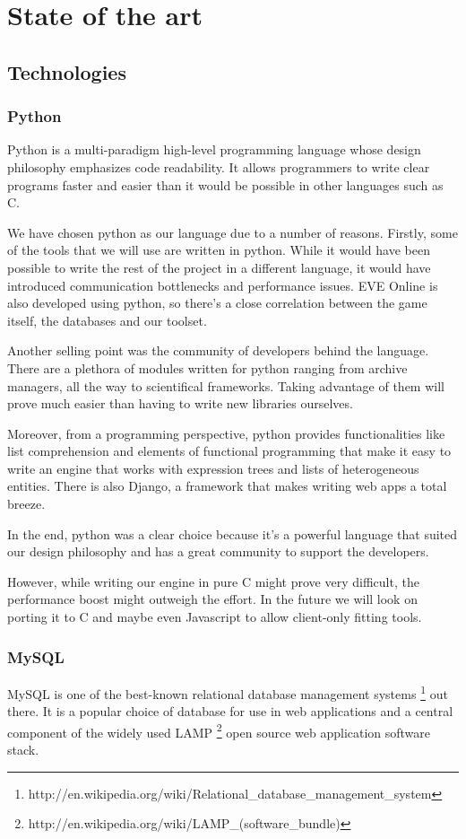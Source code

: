 \chapter{State of the art}
\label{chapter:research}

\section{Technologies}
\subsection{Python}

Python \cite{python} is a multi-paradigm high-level programming language whose design philosophy emphasizes code readability. It allows programmers to write clear programs faster and easier than it would be possible in other languages such as C.

We have chosen python as our language due to a number of reasons. Firstly, some of the tools that we will use are written in python. While it would have been possible to write the rest of the project in a different language, it would have introduced communication bottlenecks and performance issues. EVE Online is also developed using python, so there’s a close correlation between the game itself, the databases and our toolset. 

Another selling point was the community of developers behind the language. There are a plethora of modules written for python ranging from archive managers, all the way to scientifical frameworks. Taking advantage of them will prove much easier than having to write new libraries ourselves.

Moreover, from a programming perspective, python provides functionalities like list comprehension and elements of functional programming that make it easy to write an engine that works with expression trees and lists of heterogeneous entities. There is also Django, a framework that makes writing web apps a total breeze.

In the end, python was a clear choice because it’s a powerful language that suited our design philosophy and has a great community to support the developers.

However, while writing our engine in pure C might prove very difficult, the performance boost might outweigh the effort. In the future we will look on porting it to C and maybe even Javascript to allow client-only fitting tools.

\subsection{MySQL}
MySQL \cite{mysql} \cite{mysqlhigh} is one of the best-known relational database management systems \footnote{http://en.wikipedia.org/wiki/Relational_database_management_system} out there. It is a popular choice of database for use in web applications and a central component of the widely used LAMP \footnote{http://en.wikipedia.org/wiki/LAMP_(software_bundle)} open source web application software stack.

